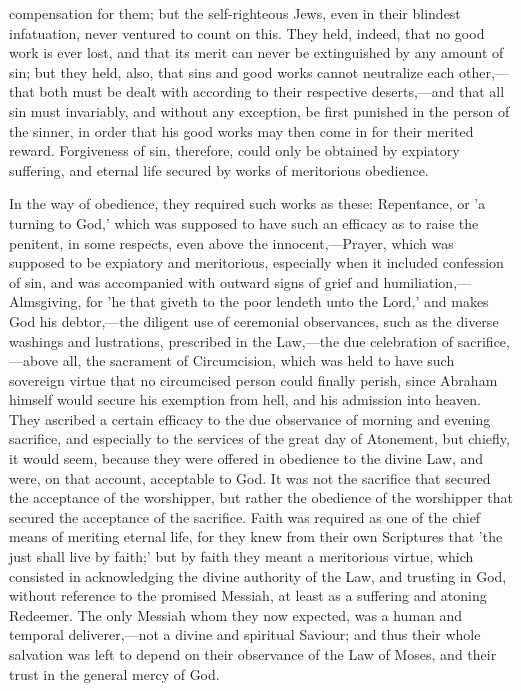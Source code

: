 \documentclass[
]{book}
\begin{document}
compensation for them; but the self-righteous Jews, even in their blindest infatuation, never ventured to count on this. They held, indeed, that no good work is ever lost, and that its merit can never be extinguished by any amount of sin; but they held, also, that sins and good works cannot neutralize each other,---that both must be dealt with according to their respective deserts,---and that all sin must invariably, and without any exception, be first punished in the person of the sinner, in order that his good works may then come in for their merited reward. Forgiveness of sin, therefore, could only be obtained by expiatory suffering, and eternal life secured by works of meritorious obedience.

In the way of obedience, they required such works as these: Repentance, or 'a turning to God,' which was supposed to have such an efficacy as to raise the penitent, in some respects, even above the innocent,---Prayer, which was supposed to be expiatory and meritorious, especially when it included confession of sin, and was accompanied with outward signs of grief and humiliation,---Almsgiving, for 'he that giveth to the poor lendeth unto the Lord,' and makes God his debtor,---the diligent use of ceremonial observances, such as the diverse washings and lustrations, prescribed in the Law,---the due celebration of sacrifice,---above all, the sacrament of Circumcision, which was held to have such sovereign virtue that no circumcised person could finally perish, since Abraham himself would secure his exemption from hell, and his admission into heaven. They ascribed a certain efficacy to the due observance of morning and evening sacrifice, and especially to the services of the great day of Atonement, but chiefly, it would seem, because they were offered in obedience to the divine Law, and were, on that account, acceptable to God. It was not the sacrifice that secured the acceptance of the worshipper, but rather the obedience of the worshipper that secured the acceptance of the sacrifice. Faith was required as one of the chief means of meriting eternal life, for they knew from their own Scriptures that 'the just shall live by faith;' but by faith they meant a meritorious virtue, which consisted in acknowledging the divine authority of the Law, and trusting in God, without reference to the promised Messiah, at least as a suffering and atoning Redeemer. The only Messiah whom they now expected, was a human and temporal deliverer,---not a divine and spiritual Saviour; and thus their whole salvation was left to depend on their observance of the Law of Moses, and their trust in the general mercy of God.
\end{document}

